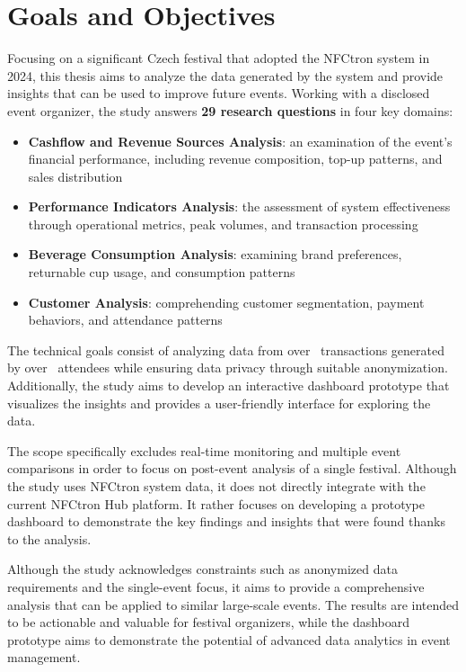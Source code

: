 \section*{Goals and Objectives}
\label{sec:goals-and-objectives}
Focusing on a significant Czech festival that adopted the NFCtron system in 2024, this thesis aims to analyze the data generated by the system and provide insights that can be used to improve future events.
Working with a disclosed event organizer, the study answers \textbf{29 research questions} in four key domains:\\
\begin{itemize}
	\item \textbf{Cashflow and Revenue Sources Analysis}: an examination of the event's financial performance, including revenue composition, top-up patterns, and sales distribution
	\item \textbf{Performance Indicators Analysis}: the assessment of system effectiveness through operational metrics, peak volumes, and transaction processing
	\item \textbf{Beverage Consumption Analysis}: examining brand preferences, returnable cup usage, and consumption patterns
	\item \textbf{Customer Analysis}: comprehending customer segmentation, payment behaviors, and attendance patterns
\end{itemize}

The technical goals consist of analyzing data from over~ transactions generated by over~ attendees while ensuring data privacy through suitable anonymization.
Additionally, the study aims to develop an interactive dashboard prototype that visualizes the insights and provides a user-friendly interface for exploring the data.

The scope specifically excludes real-time monitoring and multiple event comparisons in order to focus on post-event analysis of a single festival.
Although the study uses NFCtron system data, it does not directly integrate with the current NFCtron Hub platform.
It rather focuses on developing a prototype dashboard to demonstrate the key findings and insights that were found thanks to the analysis.

Although the study acknowledges constraints such as anonymized data requirements and the single-event focus, it aims to provide a comprehensive analysis that can be applied to similar large-scale events.
The results are intended to be actionable and valuable for festival organizers, while the dashboard prototype aims to demonstrate the potential of advanced data analytics in event management.

